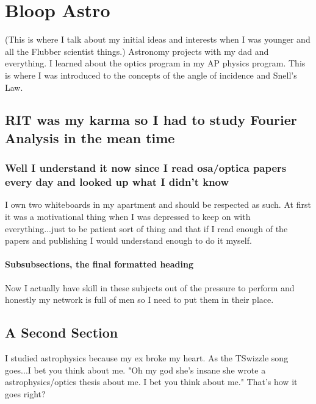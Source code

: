 \chapter{Bloop Astro}

(This is where I talk about my initial ideas and interests when I was younger and all the Flubber scientist things.) Astronomy projects with my dad and everything. 
I learned about the optics program in my AP physics program. This is where I was introduced to the concepts of the angle of incidence and Snell's Law. 

\section[Shorter Title]{RIT was my karma so I had to study Fourier Analysis in the mean time}



\subsection{Well I understand it now since I read osa/optica papers every day and looked up what I didn't know}

I own two whiteboards in my apartment and should be respected as such. At first it was a motivational thing when I was depressed to keep on with everything...just to be patient sort of thing and that if I read enough of the papers and publishing I would understand enough to do it myself. 

\subsubsection{Subsubsections, the final formatted heading}

Now I actually have skill in these subjects out of the pressure to perform and honestly my network is full of men so I need to put them in their place. 

\section{A Second Section}

I studied astrophysics because my ex broke my heart. As the TSwizzle song goes...I bet you think about me. "Oh my god she's insane she wrote a astrophysics/optics thesis about me. I bet you think about me." That's how it goes right?